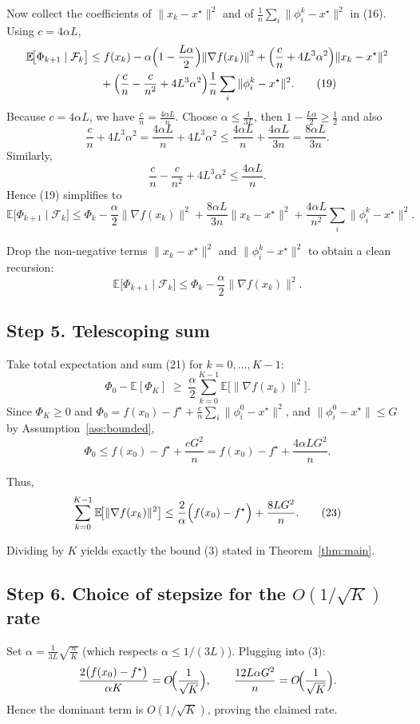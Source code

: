 \documentclass{article}
\newcommand{\E}{\mathbb{E}}
\begin{document}
Now collect the coefficients of $\|x_k-x^{\star}\|^{2}$ and of $\frac{1}{n}\sum_i\|\phi_i^{k}-x^{\star}\|^{2}$ in (16). Using $c=4\alpha L$,
\begin{align}
\E\!\bigl[\Phi_{k+1}\mid\mathcal{F}_k\bigr]
&\le f(x_k)-\alpha\Bigl(1-\frac{L\alpha}{2}\Bigr)\|\nabla f(x_k)\|^{2}
   +\Bigl(\frac{c}{n}+4L^{3}\alpha^{2}\Bigr)\|x_k-x^{\star}\|^{2} \nonumber\\
&\quad +\Bigl(\frac{c}{n}-\frac{c}{n^{2}}+4L^{3}\alpha^{2}\Bigr)\frac{1}{n}\sum_{i}\|\phi_i^{k}-x^{\star}\|^{2}. \tag{19}
\end{align}
Because $c=4\alpha L$, we have $\frac{c}{n}= \frac{4\alpha L}{n}$.
Choose $\alpha\le \frac{1}{3L}$, then $1-\frac{L\alpha}{2}\ge \frac{1}{2}$ and also
\[
\frac{c}{n}+4L^{3}\alpha^{2}
= \frac{4\alpha L}{n}+4L^{3}\alpha^{2}
\le \frac{4\alpha L}{n}+ \frac{4\alpha L}{3n}= \frac{8\alpha L}{3n}.
\]
Similarly,
\[
\frac{c}{n}-\frac{c}{n^{2}}+4L^{3}\alpha^{2}
\le \frac{4\alpha L}{n}.
\]
Hence (19) simplifies to
\[
\E\!\bigl[\Phi_{k+1}\mid\mathcal{F}_k\bigr]
\le \Phi_k -\frac{\alpha}{2}\|\nabla f(x_k)\|^{2}
   +\frac{8\alpha L}{3n}\|x_k-x^{\star}\|^{2}
   +\frac{4\alpha L}{n^{2}}\sum_{i}\|\phi_i^{k}-x^{\star}\|^{2}. \tag{20}
\]

Drop the non‑negative terms $\|x_k-x^{\star}\|^{2}$ and $\|\phi_i^{k}-x^{\star}\|^{2}$ to obtain a clean recursion:
\[
\E\!\bigl[\Phi_{k+1}\mid\mathcal{F}_k\bigr]
\le \Phi_k -\frac{\alpha}{2}\|\nabla f(x_k)\|^{2}. \tag{21}
\]

\subsection*{Step 5. Telescoping sum}
Take total expectation and sum (21) for $k=0,\dots,K-1$:
\[
\Phi_0 - \E[\Phi_K] \;\ge\; \frac{\alpha}{2}\sum_{k=0}^{K-1}\E\!\bigl[\|\nabla f(x_k)\|^{2}\bigr].
\]
Since $\Phi_K\ge 0$ and $\Phi_0 = f(x_0)-f^{\star}+ \frac{c}{n}\sum_i\|\phi_i^{0}-x^{\star}\|^{2}$,
and $\|\phi_i^{0}-x^{\star}\|\le G$ by Assumption~\ref{ass:bounded},
\[
\Phi_0 \le f(x_0)-f^{\star}+ \frac{c G^{2}}{n}
= f(x_0)-f^{\star}+ \frac{4\alpha L G^{2}}{n}. \tag{22}
\]

Thus,
\[
\sum_{k=0}^{K-1}\E\!\bigl[\|\nabla f(x_k)\|^{2}\bigr]
\le \frac{2}{\alpha}\Bigl(f(x_0)-f^{\star}\Bigr)
   + \frac{8 L G^{2}}{n}. \tag{23}
\]

Dividing by $K$ yields exactly the bound (3) stated in Theorem~\ref{thm:main}.

\subsection*{Step 6. Choice of stepsize for the $O(1/\sqrt{K})$ rate}
Set $\alpha=\frac{1}{3L}\sqrt{\frac{n}{K}}$ (which respects $\alpha\le 1/(3L)$). Plugging into (3):
\[
\frac{2\bigl(f(x_0)-f^{\star}\bigr)}{\alpha K}
= O\!\Bigl(\frac{1}{\sqrt{K}}\Bigr),\qquad
\frac{12L\alpha G^{2}}{n}= O\!\Bigl(\frac{1}{\sqrt{K}}\Bigr).
\]
Hence the dominant term is $O(1/\sqrt{K})$, proving the claimed rate.
\end{document}
